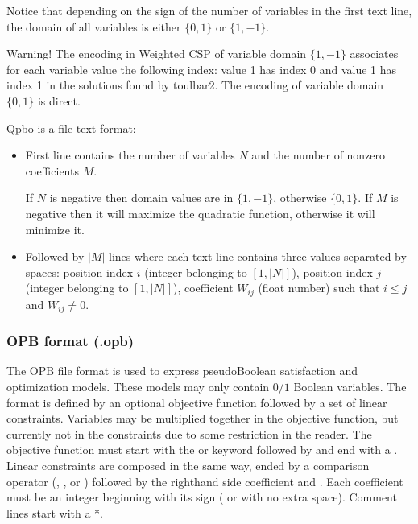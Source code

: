 \documentclass[letterpaper,10pt,openany,oneside,english]{sphinxmanual}
\begin{document}
\sphinxAtStartPar
Notice that depending on the sign of the number of variables in the first text line, the domain of all variables is either \(\{0,1\}\) or \(\{1,-1\}\).

\sphinxAtStartPar
Warning! The encoding in Weighted CSP of variable domain \(\{1,-1\}\) associates for each variable value the following index: value 1 has index 0 and value \sphinxhyphen{}1 has index 1 in the solutions found by toulbar2.
The encoding  of variable domain \(\{0,1\}\) is direct.

\sphinxAtStartPar
Qpbo is a file text format:
\begin{itemize}
\item {} 
\sphinxAtStartPar
First line contains the number of variables \(N\) and the number of non\sphinxhyphen{}zero coefficients \(M\).

\sphinxAtStartPar
If \(N\) is negative then domain values are in \(\{1, -1\}\), otherwise \(\{0, 1\}\).
If \(M\) is negative then it will maximize the quadratic function, otherwise it will minimize it.

\item {} 
\sphinxAtStartPar
Followed by \(|M|\) lines where each text line contains three values separated by spaces:
position index \(i\) (integer belonging to \([1,|N|]\)),
position index \(j\) (integer belonging to \([1,|N|]\)),
coefficient \(W_{ij}\) (float number)
such that \(i \leq j\) and \(W_{ij} \neq 0\).

\end{itemize}

\sphinxstepscope


\subsubsection{OPB format (.opb)}
\label{\detokenize{formats/opbformat:opb-format-opb}}\label{\detokenize{formats/opbformat:opb-format}}\label{\detokenize{formats/opbformat::doc}}
\sphinxAtStartPar
The OPB file format is used to express pseudo\sphinxhyphen{}Boolean satisfaction and optimization models.
These models may only contain \(0/1\) Boolean variables. The format is defined by an optional objective function followed by a set of linear constraints.
Variables may be multiplied together in the objective function, but currently not in the constraints due to some restriction in the reader.
The objective function must start with the  or  keyword followed by  and end with a \sphinxstylestrong{;}.
Linear constraints are composed in the same way, ended by a comparison operator (\sphinxstylestrong{\textless{}=}, \sphinxstylestrong{\textgreater{}=}, or \sphinxstylestrong{!=}) followed by the right\sphinxhyphen{}hand side coefficient and \sphinxstylestrong{;}.
Each coefficient must be an integer beginning with its sign (\sphinxstylestrong{+} or \sphinxstylestrong{\sphinxhyphen{}} with no extra space).
Comment lines start with a *.
\end{document}
